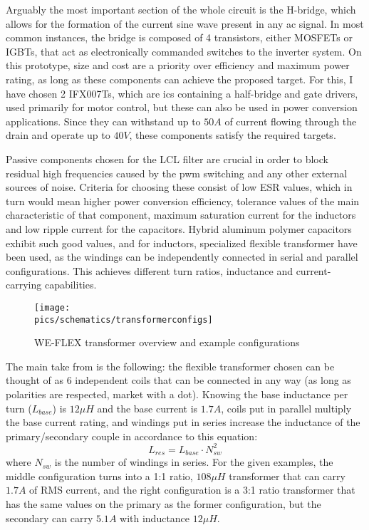 Arguably the most important section of the whole circuit is the \gls{H-bridge}, which allows for the formation of the current sine wave present in any \gls{ac} signal.
In most common instances, the bridge is composed of 4 transistors, either MOSFETs or IGBTs, that act as electronically commanded switches to the inverter system. On this prototype, size and cost are a priority over efficiency and maximum power rating, as long as these components can achieve the proposed target.
For this, I have chosen 2 IFX007Ts, which are \gls{ic}s containing a half-bridge and gate drivers, used primarily for motor control, but these can also be used in power conversion applications.
Since they can withstand up to $50A$ of current flowing through the drain and operate up to $40V$, these components satisfy the required targets.

Passive components chosen for the LCL filter are crucial in order to block residual high frequencies caused by the \gls{pwm} switching and any other external sources of noise\cite{reznik2013lcl, systematiclcl2015}.
Criteria for choosing these consist of low ESR values, which in turn would mean higher power conversion efficiency, tolerance values of the main characteristic of that component, maximum saturation current for the inductors and low ripple current for the capacitors.
Hybrid aluminum polymer capacitors exhibit such good values, and for inductors, specialized flexible transformer have been used, as the windings can be independently connected in serial and parallel configurations. This achieves different turn ratios, inductance and current-carrying capabilities.

\begin{figure}[!ht]
    \begin{center}\texttt{[image: \\pics/schematics/transformerconfigs]}\end{center}
    \caption{WE-FLEX transformer overview and example configurations}
    \label{fig:transf}
\end{figure}

The main take from  is the following: the flexible transformer chosen can be thought of as 6 independent coils that can be connected in any way (as long as polarities are respected, market with a dot).
Knowing the base inductance per turn ($L_{base}$) is $12\mu H$ and the base current is $1.7A$, coils put in parallel multiply the base current rating, and windings put in series increase the inductance of the primary/secondary couple in accordance to this equation:
\begin{equation}
    \label{eq:Lwindings}
    L_{res}=L_{base} \cdot N_{sw}^2
\end{equation}
where $N_{sw}$ is the number of windings in series.
For the given examples, the middle configuration turns into a 1:1 ratio, $108\mu H$ transformer that can carry $1.7A$ of RMS current, and the right configuration is a 3:1 ratio transformer that has the same values on the primary as the former configuration, but the secondary can carry $5.1A$ with inductance $12\mu H$.

